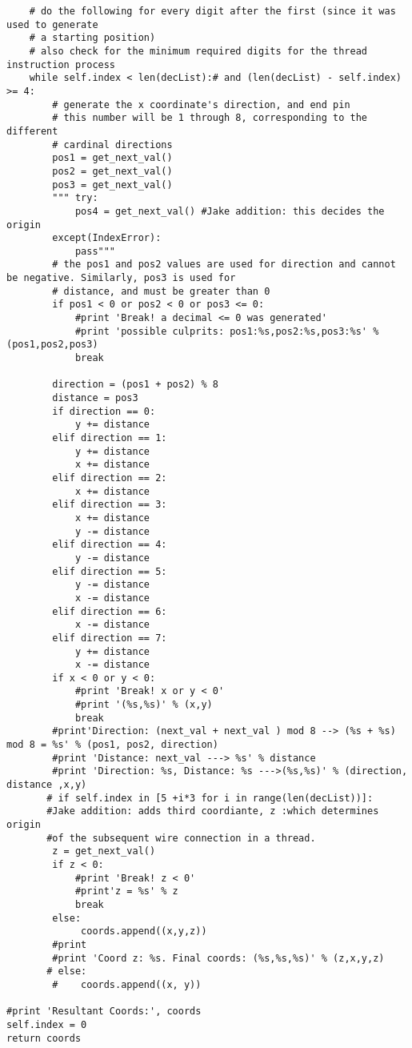 \documentclass[a4paper]{article}
\begin{document}
\begin{enumerate}
\begin{enumerate}
\begin{verbatim}
    # do the following for every digit after the first (since it was used to generate
    # a starting position)
    # also check for the minimum required digits for the thread instruction process
    while self.index < len(decList):# and (len(decList) - self.index) >= 4:
        # generate the x coordinate's direction, and end pin
        # this number will be 1 through 8, corresponding to the different
        # cardinal directions
        pos1 = get_next_val()
        pos2 = get_next_val()
        pos3 = get_next_val()
        """ try:
            pos4 = get_next_val() #Jake addition: this decides the origin
        except(IndexError):
            pass"""
        # the pos1 and pos2 values are used for direction and cannot be negative. Similarly, pos3 is used for
        # distance, and must be greater than 0
        if pos1 < 0 or pos2 < 0 or pos3 <= 0:
            #print 'Break! a decimal <= 0 was generated'
            #print 'possible culprits: pos1:%s,pos2:%s,pos3:%s' % (pos1,pos2,pos3)
            break

        direction = (pos1 + pos2) % 8
        distance = pos3
        if direction == 0:
            y += distance
        elif direction == 1:
            y += distance
            x += distance
        elif direction == 2:
            x += distance
        elif direction == 3:
            x += distance
            y -= distance
        elif direction == 4:
            y -= distance
        elif direction == 5:
            y -= distance
            x -= distance
        elif direction == 6:
            x -= distance
        elif direction == 7:
            y += distance
            x -= distance
        if x < 0 or y < 0:
            #print 'Break! x or y < 0'
            #print '(%s,%s)' % (x,y)
            break
        #print'Direction: (next_val + next_val ) mod 8 --> (%s + %s) mod 8 = %s' % (pos1, pos2, direction)
        #print 'Distance: next_val ---> %s' % distance
        #print 'Direction: %s, Distance: %s --->(%s,%s)' % (direction, distance ,x,y)
       # if self.index in [5 +i*3 for i in range(len(decList))]:
       #Jake addition: adds third coordiante, z :which determines origin
       #of the subsequent wire connection in a thread.
        z = get_next_val()
        if z < 0:
            #print 'Break! z < 0'
            #print'z = %s' % z
            break
        else:
             coords.append((x,y,z))
        #print
        #print 'Coord z: %s. Final coords: (%s,%s,%s)' % (z,x,y,z)
       # else:
        #    coords.append((x, y))

#print 'Resultant Coords:', coords
self.index = 0
return coords
\end{verbatim}
\end{enumerate}
\end{enumerate}
\end{document}
